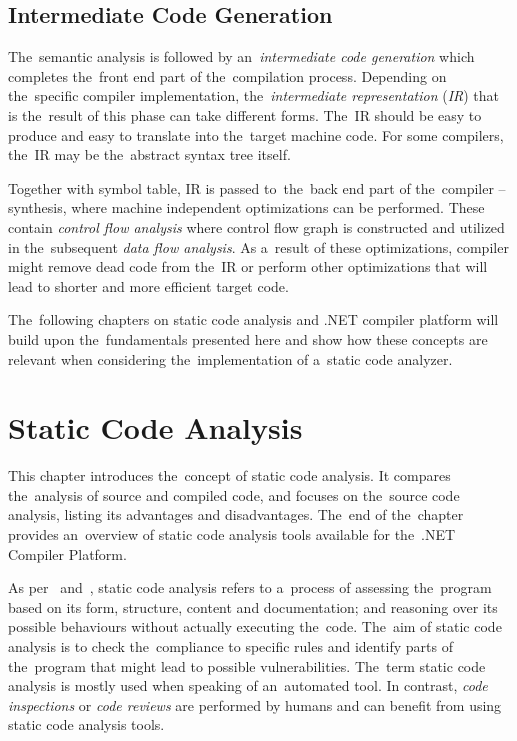\documentclass[
  digital, %
  table,   %
  lof,     %
  lot,     %
  oneside,
]{fithesis3}
\begin{document}
\section{Intermediate Code Generation}
The~semantic analysis is followed by an~\textit{intermediate code generation} which completes the~front end part of the~compilation process. Depending on the~specific compiler implementation, the~\textit{intermediate representation} (\textit{IR}) that is the~result of this phase can take different forms. The~IR should be easy to produce and easy to translate into the~target machine code. For some compilers, the~IR may be the~abstract syntax tree itself.

Together with symbol table, IR is passed to~the~back end part of the~compiler -- synthesis, where machine independent optimizations can be performed. These contain \textit{control flow analysis} where control flow graph is constructed and utilized in the~subsequent \textit{data flow analysis}. As a~result of these optimizations, compiler might remove dead code from the~IR or perform other optimizations that will lead to shorter and more efficient target code.

\bigskip
The~following chapters on static code analysis and .NET compiler platform will build upon the~fundamentals presented here and show how these concepts are relevant when considering the~implementation of a~static code analyzer.

\chapter{Static Code Analysis}
\label{chap:static-code-analysis}
This chapter introduces the~concept of static code analysis. It compares the~analysis of source and compiled code, and focuses on the~source code analysis, listing its advantages and disadvantages. The~end of the~chapter provides an~overview of static code analysis tools available for the~.NET Compiler Platform.

As per~\cite{sca-ppt} and~\cite{sca-approach-in-sw-dev}, static code analysis refers to a~process of assessing the~program based on its form, structure, content and documentation; and reasoning over its possible behaviours without actually executing the~code. The~aim of static code analysis is to check the~compliance to specific rules and identify parts of the~program that might lead to possible vulnerabilities. The~term static code analysis is mostly used when speaking of an~automated tool. In contrast, \textit{code inspections} or \textit{code reviews} are performed by humans and can benefit from using static code analysis tools.
\end{document}

